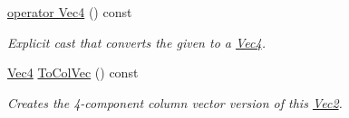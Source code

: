 \begin{DoxyCompactItemize}
\hyperlink{classgofxmath_1_1_vec2_a949ce7bfa411ce89c4b6673562c9014c}{operator Vec4} () const 
\begin{DoxyCompactList}\small\item\em Explicit cast that converts the given to a \hyperlink{classgofxmath_1_1_vec4}{Vec4}. \end{DoxyCompactList}\item 
\hyperlink{classgofxmath_1_1_vec4}{Vec4} \hyperlink{classgofxmath_1_1_vec2_ac6d67e7a1efea2e66b63eda0e36aa069}{To\+Col\+Vec} () const 
\begin{DoxyCompactList}\small\item\em Creates the 4-\/component column vector version of this \hyperlink{classgofxmath_1_1_vec2}{Vec2}. \end{DoxyCompactList}\end{DoxyCompactItemize}
